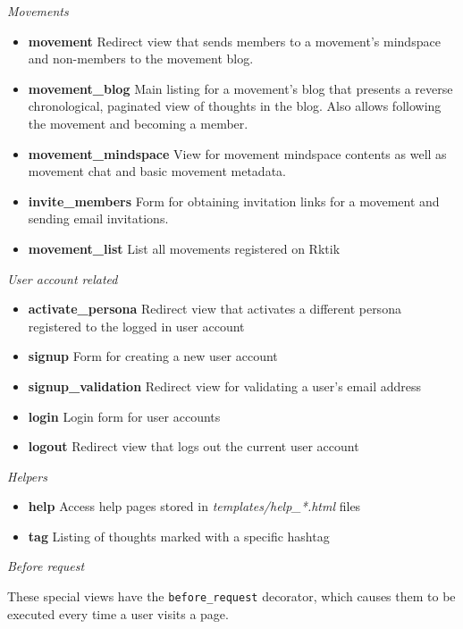 \emph{Movements}

\begin{itemize}
\tightlist
\item
  \textbf{movement} Redirect view that sends members to a movement's
  mindspace and non-members to the movement blog.
\item
  \textbf{movement\_blog} Main listing for a movement's blog that
  presents a reverse chronological, paginated view of thoughts in the
  blog. Also allows following the movement and becoming a member.
\item
  \textbf{movement\_mindspace} View for movement mindspace contents as
  well as movement chat and basic movement metadata.
\item
  \textbf{invite\_members} Form for obtaining invitation links for a
  movement and sending email invitations.
\item
  \textbf{movement\_list} List all movements registered on Rktik
\end{itemize}

\emph{User account related}

\begin{itemize}
\tightlist
\item
  \textbf{activate\_persona} Redirect view that activates a different
  persona registered to the logged in user account
\item
  \textbf{signup} Form for creating a new user account
\item
  \textbf{signup\_validation} Redirect view for validating a user's
  email address
\item
  \textbf{login} Login form for user accounts
\item
  \textbf{logout} Redirect view that logs out the current user account
\end{itemize}

\emph{Helpers}

\begin{itemize}
\tightlist
\item
  \textbf{help} Access help pages stored in
  \emph{templates/help\_*.html} files
\item
  \textbf{tag} Listing of thoughts marked with a specific hashtag
\end{itemize}

\emph{Before request}

These special views have the \texttt{before\_request} decorator, which
causes them to be executed every time a user visits a page.

